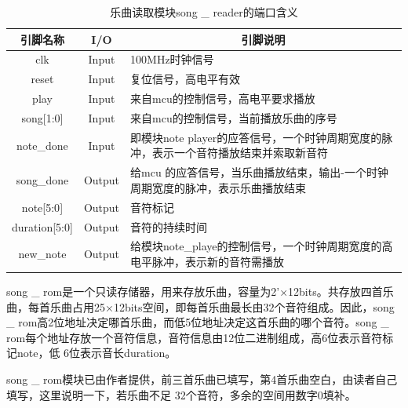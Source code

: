 \documentclass{../source/Experiment}
\begin{document}
                \begin{table}[H]
                    \caption{乐曲读取模块song \_ reader的端口含义}
                    \begin{tabular}{|c|c|p{}|}
                        \hline
                        引脚名称              & I/O    & \multicolumn{1}{c|}{引脚说明}                        \\ \hline
                        clk               & Input  & 100MHz时钟信号                                       \\ \hline
                        reset             & Input  & 复位信号，高电平有效                                       \\ \hline
                        play              & Input  & 来自mcu的控制信号，高电平要求播放                               \\ \hline
                        song{[}1:0{]}     & Input  & 来自mcu的控制信号，当前播放乐曲的序号                             \\ \hline
                        note\_done        & Input  & 即模块note player的应答信号，一个时钟周期宽度的脉冲，表示一个音符播放结束并索取新音符 \\ \hline
                        song\_done        & Output & 给mcu 的应答信号，当乐曲播放结束，输出-一个时钟周期宽度的脉冲，表示乐曲播放结束       \\ \hline
                        note{[}5:0{]}     & Output & 音符标记                                             \\ \hline
                        duration{[}5:0{]} & Output & 音符的持续时间                                          \\ \hline
                        new\_note         & Output & 给模块note\_playe的控制信号，一个时钟周期宽度的高电平脉冲，表示新的音符需播放     \\ \hline
                    \end{tabular}
                \end{table}

                song \_ rom是一个只读存储器，用来存放乐曲，容量为2'×12bits。共存放四首乐曲，每首乐曲占用25×12bits空间，即每首乐曲最长由32个音符组成。因此，song \_ rom高2位地址决定哪首乐曲，而低5位地址决定这首乐曲的哪个音符。song \_ rom每个地址存放一个音符信息，音符信息由12位二进制组成，高6位表示音符标记note，低 6位表示音长duration。 
                
                song \_ rom模块已由作者提供，前三首乐曲已填写，第4首乐曲空白，由读者自己填写，这里说明一下，若乐曲不足 32个音符，多余的空间用数字0填补。
                
\end{document}
